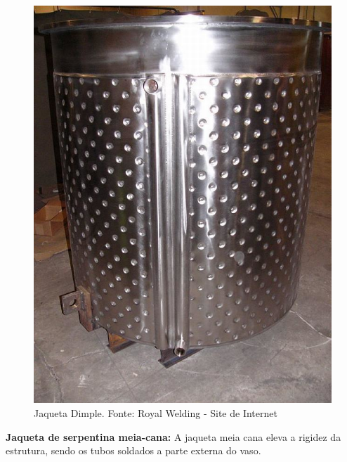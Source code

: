 \begin{figure}[h]
	\centering
	\includegraphics[keepaspectratio=true,scale=0.2]{figuras/jaqueta3.eps}
	\caption{Jaqueta Dimple. Fonte: Royal Welding - Site de Internet}
	\label{jaqueta3}
\end{figure}

\textbf{Jaqueta de serpentina meia-cana:} A jaqueta meia cana eleva a rigidez da estrutura, sendo os tubos soldados a parte externa do vaso.

